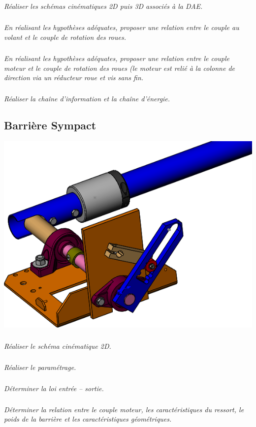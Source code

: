 \documentclass[10pt,fleqn]{article} %
\begin{document}
\begin{multicols}{2}
\subparagraph{}
\textit{Réaliser les schémas cinématiques 2D puis 3D associés à la DAE.}

\subparagraph{}
\textit{En réalisant les hypothèses adéquates, proposer une relation entre le couple au volant et le couple de rotation des roues.}


\subparagraph{}
\textit{En réalisant les hypothèses adéquates, proposer une relation entre le couple moteur et le couple de rotation des roues (le moteur est relié à la colonne de direction via un réducteur roue et vis sans fin.}


\subparagraph{}
\textit{Réaliser la chaîne d'information et la chaîne d'énergie.}


\subsection*{Barrière Sympact}
\setcounter{exo}{0}
\begin{center}
\includegraphics[width=\linewidth]{images/sympact_01}
\end{center}

\subparagraph{}
\textit{Réaliser le schéma cinématique 2D.}

\subparagraph{}
\textit{Réaliser le paramétrage.}


\subparagraph{}
\textit{Déterminer la loi entrée -- sortie.}



\subparagraph{}
\textit{Déterminer la relation entre le couple moteur, les caractéristiques du ressort, le poids de la barrière et les caractéristiques géométriques. }


\end{multicols}
\end{document}
